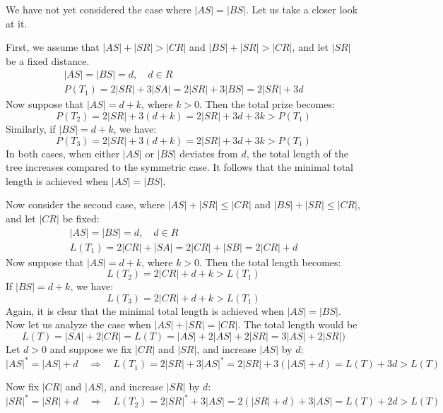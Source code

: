 \documentclass[12pt]{article}
\newcommand{\Ptotal}[1]{P(#1)}
\begin{document}
	
		 
	
	
	We have not yet considered the case where \( |AS| = |BS| \). Let us take a closer look at it. 
	
	First, we assume that \( |AS| + |SR| > |CR| \) and \( |BS| + |SR| > |CR| \), and let \( |SR| \) be a fixed distance.
	\begin{align*}
		|AS| = |BS| = d, \quad d \in R \\
		\Ptotal{T_1} = 2|SR| + 3|SA| = 2|SR| + 3|BS| = 2|SR| + 3d
	\end{align*}
	Now suppose that \( |AS| = d + k \), where \( k > 0 \). Then the total prize becomes:
	\[
	\Ptotal{T_2} = 2|SR| + 3(d + k) = 2|SR| + 3d + 3k > \Ptotal{T_1}
	\]
	Similarly, if \( |BS| = d + k \), we have:
	\[
	\Ptotal{T_3} = 2|SR| + 3(d + k) = 2|SR| + 3d + 3k > \Ptotal{T_1}
	\]
	In both cases, when either \( |AS| \) or \( |BS| \) deviates from \( d \), the total length of the tree increases compared to the symmetric case. It follows that the minimal total length is achieved when \( |AS| = |BS| \).
	
	Now consider the second case, where \( |AS| + |SR| \leq |CR| \) and \( |BS| + |SR| \leq |CR| \), and let \( |CR| \) be fixed:
	\begin{align*}
		|AS| = |BS| = d, \quad d \in R \\
		L(T_1) = 2|CR| + |SA| = 2|CR| + |SB| = 2|CR| + d
	\end{align*}
	Now suppose that \( |AS| = d + k \), where \( k > 0 \). Then the total length becomes:
	\[
	L(T_2) = 2|CR| + d + k > L(T_1)
	\]
	If \( |BS| = d + k \), we have:
	\[
	L(T_3) = 2|CR| + d + k > L(T_1)
	\]
	Again, it is clear that the minimal total length is achieved when \( |AS| = |BS| \).\\

	Now let us analyze the case when \(|AS|+|SR| = |CR| \).
	The total length would be \[ L(T) = |SA| + 2 |CR| = L(T) = |AS| + 2|AS| + 2|SR| = 3|AS| + 2|SR|  )\]
	Let \( d > 0 \) and suppose we fix \( |CR| \) and \( |SR| \), and increase \( |AS| \) by \( d \):
	\[
	|AS|^* = |AS| + d \quad \Rightarrow \quad L(T_1) = 2|SR| + 3|AS|^* = 2|SR| + 3(|AS| + d) = L(T) + 3d > L(T)
	\]
	
	Now fix \( |CR| \) and \( |AS| \), and increase \( |SR| \) by \( d \):
	\[
	|SR|^* = |SR| + d \quad \Rightarrow \quad L(T_2) = 2|SR|^* + 3|AS| = 2(|SR| + d) + 3|AS| = L(T) + 2d > L(T)
	\]
	
\end{document}

